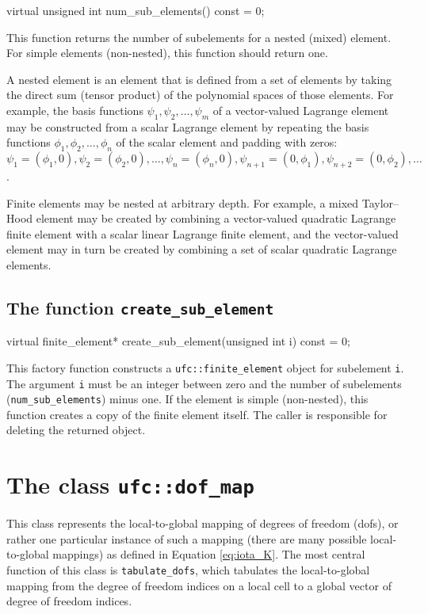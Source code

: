 \begin{code}
virtual unsigned int num_sub_elements() const = 0;
\end{code}

This function returns the number of subelements for a nested (mixed)
element. For simple elements (non-nested), this function should return
one.

A nested element is an element that is defined from a set of elements
by taking the direct sum (tensor product) of the polynomial spaces of
those elements. For example, the basis functions $\psi_1, \psi_2,
\ldots, \psi_m$ of a vector-valued Lagrange element may be constructed
from a scalar Lagrange element by repeating the basis functions
$\phi_1, \phi_2, \ldots, \phi_n$ of the scalar element and padding
with zeros: $\psi_1 = (\phi_1, 0), \psi_2 = (\phi_2, 0), \ldots,
\psi_n = (\phi_n, 0), \psi_{n+1} = (0, \phi_1), \psi_{n+2} = (0,
\phi_2), \ldots$.

Finite elements may be nested at arbitrary depth. For example, a mixed
Taylor--Hood element may be created by combining a vector-valued
quadratic Lagrange finite element with a scalar linear Lagrange finite
element, and the vector-valued element may in turn be created by
combining a set of scalar quadratic Lagrange elements.

\subsection{The function \texttt{create\_sub\_element}}

\begin{code}
virtual finite_element*
create_sub_element(unsigned int i) const = 0;
\end{code}

This factory function constructs a \texttt{ufc::finite\_element}
object for subelement \texttt{i}. The argument \texttt{i} must be an
integer between zero and the number of subelements
(\texttt{num\_sub\_elements}) minus one. If the element is simple
(non-nested), this function creates a copy of the finite element
itself. The caller is responsible for deleting the returned object.

\section{The class \texttt{ufc::dof\_map}}

This class represents the local-to-global mapping of degrees of
freedom (dofs), or rather one particular instance of such a mapping
(there are many possible local-to-global mappings) as defined in
Equation \eqref{eq:iota_K}. The most central function of this class is
\texttt{tabulate\_dofs}, which tabulates the local-to-global mapping
from the degree of freedom indices on a local cell to a global vector of
degree of freedom indices.

